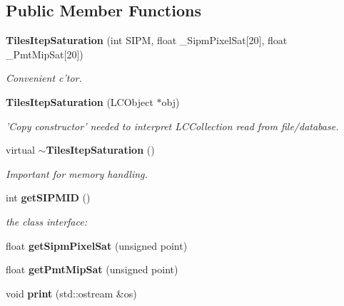 \subsection*{Public Member Functions}
\begin{DoxyCompactItemize}
\item 
{\bf Tiles\-Itep\-Saturation} (int S\-I\-P\-M, float \-\_\-\-Sipm\-Pixel\-Sat[20], float \-\_\-\-Pmt\-Mip\-Sat[20])\label{classCALICE_1_1TilesItepSaturation_a137e2d51af34a1e2da83760a187b5190}

\begin{DoxyCompactList}\small\item\em Convenient c'tor. \end{DoxyCompactList}\item 
{\bf Tiles\-Itep\-Saturation} (L\-C\-Object $\ast$obj)\label{classCALICE_1_1TilesItepSaturation_a0dc9854db9d9e2a0bcf771004db6497b}

\begin{DoxyCompactList}\small\item\em 'Copy constructor' needed to interpret L\-C\-Collection read from file/database. \end{DoxyCompactList}\item 
virtual {\bf $\sim$\-Tiles\-Itep\-Saturation} ()\label{classCALICE_1_1TilesItepSaturation_afe66e11277de87e0f32a18718d936537}

\begin{DoxyCompactList}\small\item\em Important for memory handling. \end{DoxyCompactList}\item 
int {\bf get\-S\-I\-P\-M\-I\-D} ()\label{classCALICE_1_1TilesItepSaturation_a652ac3e86905397910764be8679fc1c0}

\begin{DoxyCompactList}\small\item\em the class interface\-: \end{DoxyCompactList}\item 
float {\bfseries get\-Sipm\-Pixel\-Sat} (unsigned point)\label{classCALICE_1_1TilesItepSaturation_a092ef805416c5a4fa2c42d6e05755365}

\item 
float {\bfseries get\-Pmt\-Mip\-Sat} (unsigned point)\label{classCALICE_1_1TilesItepSaturation_abef08955e261b0c3b419ba56ece1d5df}

\item 
void {\bf print} (std\-::ostream \&os)\label{classCALICE_1_1TilesItepSaturation_a4b40234c9e0d1c22c2a13fa47b4fad7d}


\end{DoxyCompactItemize}
